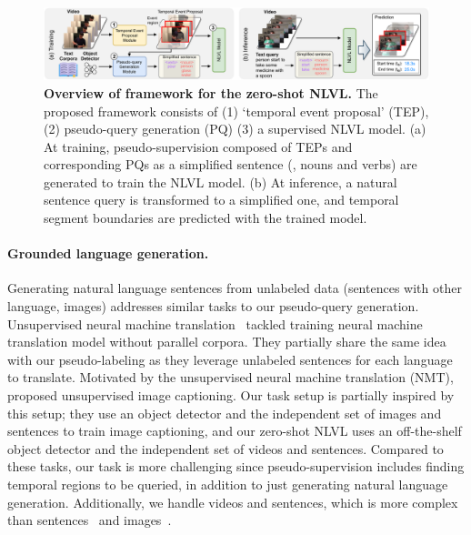 \begin{figure}[t]
    \centering
    \includegraphics[width=1\linewidth]{figures/scenario.pdf}
    \caption{\textbf{Overview of \method framework for the zero-shot NLVL.} The proposed framework consists of (1) `temporal event proposal' (TEP), (2) pseudo-query generation (PQ) (3) a supervised NLVL model. (a) At training, pseudo-supervision composed of TEPs and corresponding PQs as a simplified sentence (\ie, nouns and verbs) are generated to train the NLVL model. (b) At inference, a natural sentence query is transformed to a simplified one, and temporal segment boundaries are predicted with the trained model.}
    \vspace{-0.5em}
    \label{fig:scenario}
\end{figure}

\vspace{-1em}\paragraph{Grounded language generation.}
Generating natural language sentences from unlabeled data (\eg sentences with other language, images) addresses similar tasks to our pseudo-query generation.  
Unsupervised neural machine translation~\cite{Artetxe2018UnsupervisedNM,Lample2018UnsupervisedMT,lample2018phrase} tackled training neural machine translation model without parallel corpora. 
They partially share the same idea with our pseudo-labeling as they leverage unlabeled sentences for each language to translate.
Motivated by the unsupervised neural machine translation (NMT), \cite{Feng2019UnsupervisedIC,laina2019towards} proposed unsupervised image captioning. 
Our task setup is partially inspired by this setup; they use an object detector and the independent set of images and sentences to train image captioning, and our zero-shot NLVL uses an off-the-shelf object detector and the independent set of videos and sentences.
Compared to these tasks, our task is more challenging since pseudo-supervision includes finding temporal regions to be queried, in addition to just generating natural language generation.
Additionally, we handle videos and sentences, which is more complex than sentences~\cite{Artetxe2018UnsupervisedNM,Lample2018UnsupervisedMT,lample2018phrase} and images~\cite{Feng2019UnsupervisedIC,laina2019towards}.



